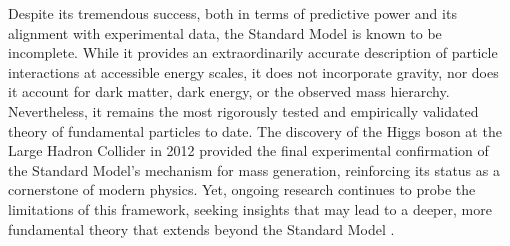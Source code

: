 Despite its tremendous success, both in terms of predictive power and its alignment with experimental data, the Standard Model is known to be incomplete. While it provides an extraordinarily accurate description of particle interactions at accessible energy scales, it does not incorporate gravity, nor does it account for dark matter, dark energy, or the observed mass hierarchy. Nevertheless, it remains the most rigorously tested and empirically validated theory of fundamental particles to date. The discovery of the Higgs boson at the Large Hadron Collider in 2012 provided the final experimental confirmation of the Standard Model’s mechanism for mass generation, reinforcing its status as a cornerstone of modern physics. Yet, ongoing research continues to probe the limitations of this framework, seeking insights that may lead to a deeper, more fundamental theory that extends beyond the Standard Model \cite{TheStand35}.











